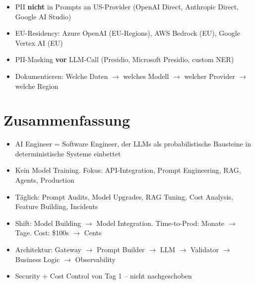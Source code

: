 
\begin{itemize}[leftmargin=*]
    \item PII \textbf{nicht} in Prompts an US-Provider (OpenAI Direct, Anthropic Direct, Google AI Studio)
    \item EU-Residency: Azure OpenAI (EU-Regions), AWS Bedrock (EU), Google Vertex AI (EU)
    \item PII-Masking \textbf{vor} LLM-Call (Presidio, Microsoft Presidio, custom NER)
    \item Dokumentieren: Welche Daten $\to$ welches Modell $\to$ welcher Provider $\to$ welche Region
\end{itemize}

\section{Zusammenfassung}

\begin{itemize}[leftmargin=*]
    \item AI Engineer = Software Engineer, der LLMs als probabilistische Bausteine in deterministische Systeme einbettet
    \item Kein Model Training. Fokus: API-Integration, Prompt Engineering, RAG, Agents, Production
    \item Täglich: Prompt Audits, Model Upgrades, RAG Tuning, Cost Analysis, Feature Building, Incidents
    \item Shift: Model Building $\to$ Model Integration. Time-to-Prod: Monate $\to$ Tage. Cost: \$100s $\to$ Cents
    \item Architektur: Gateway $\to$ Prompt Builder $\to$ LLM $\to$ Validator $\to$ Business Logic $\to$ Observability
    \item Security + Cost Control von Tag 1 -- nicht nachgeschoben
\end{itemize}




